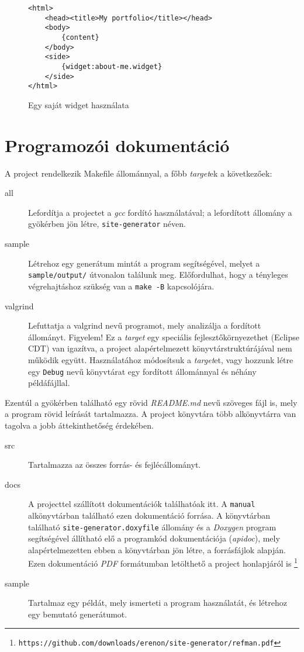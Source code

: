 \documentclass[a4paper,10pt]{article}
\begin{document}
\begin{figure}[h]
	\begin{center}
		\begin{lstlisting}
<html>
	<head><title>My portfolio</title></head>
	<body>
		{content}
	</body>
	<side>
		{widget:about-me.widget}
	</side>
</html>
		\end{lstlisting}
		\caption{Egy saját widget használata}
		\label{fig:widget}
	\end{center}
\end{figure}


\section{Programozói dokumentáció}
A project rendelkezik Makefile állománnyal, a főbb \emph{target}ek a következőek:

\begin{description}
	\item[all] Lefordítja a projectet a \emph{gcc} fordító használatával; a lefordított állomány a gyökérben jön létre, \texttt{site-generator} néven.

	\item[sample] Létrehoz egy generátum mintát a program segítségével, melyet a \texttt{sample/output/} útvonalon találunk meg. Előfordulhat, hogy a tényleges végrehajtáshoz szükség van a \texttt{make -B} kapcsolójára.

	\item[valgrind] Lefuttatja a valgrind nevű programot, mely analizálja a fordított állományt. Figyelem! Ez a \emph{target} egy speciális fejlesztőkörnyezethet (Eclipse CDT) van igazítva, a project alapértelmezett könyvtárstruktúrájával nem működik együtt. Használatához módosítsuk a \emph{target}et, vagy hozzunk létre egy \texttt{Debug} nevű könyvtárat egy fordított állománnyal és néhány példáfájllal.
\end{description}

Ezentúl a gyökérben található egy rövid \emph{README.md} nevű szöveges fájl is, mely a program rövid leírását tartalmazza. A project könyvtára több alkönyvtárra van tagolva a jobb áttekinthetőség érdekében.

\begin{description}
	\item[src] Tartalmazza az összes forrás- és fejlécállományt.
	\item[docs] A projecttel szállított dokumentációk találhatóak itt. A \texttt{manual} alkönyvtárban található ezen dokumentáció forrása. A könyvtárban található \texttt{site-generator.doxyfile} állomány és a \emph{Doxygen} program segítségével állítható elő a programkód dokumentációja (\emph{apidoc}), mely alapértelmezetten ebben a könyvtárban jön létre, a forrásfájlok alapján. Ezen dokumentáció \emph{PDF} formátumban letölthető a project honlapjáról is \footnote{\texttt{https://github.com/downloads/erenon/site-generator/refman.pdf}}
	\item[sample] Tartalmaz egy példát, mely ismerteti a program használatát, és létrehoz egy bemutató generátumot.
\end{description}
\end{document}
